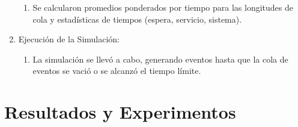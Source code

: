 \documentclass[12pt]{article}
\begin{document}
\begin{enumerate}
\begin{enumerate}
        \item Se calcularon promedios ponderados por tiempo para las longitudes de cola y estadísticas de tiempos (espera, servicio, sistema).
    \end{enumerate}
    \item Ejecución de la Simulación:
    \begin{enumerate}
        \item La simulación se llevó a cabo, generando eventos hasta que la cola de eventos se vació o se alcanzó el tiempo límite.
    \end{enumerate}
\end{enumerate}

\section{Resultados y Experimentos}
\end{document}
